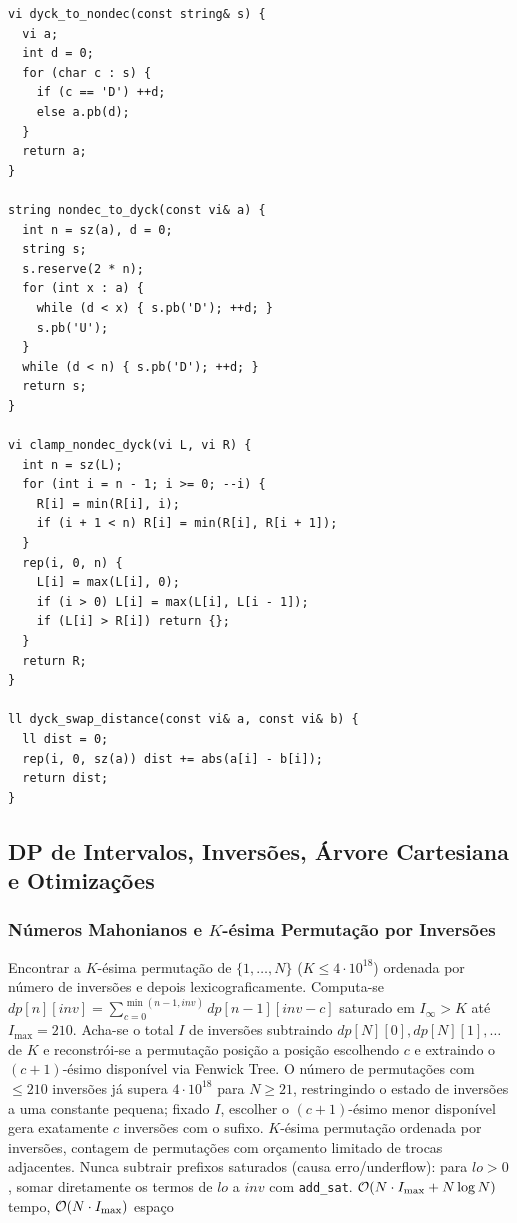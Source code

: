 \begin{lstlisting}
vi dyck_to_nondec(const string& s) {
  vi a;
  int d = 0;
  for (char c : s) {
    if (c == 'D') ++d;
    else a.pb(d);
  }
  return a;
}

string nondec_to_dyck(const vi& a) {
  int n = sz(a), d = 0;
  string s;
  s.reserve(2 * n);
  for (int x : a) {
    while (d < x) { s.pb('D'); ++d; }
    s.pb('U');
  }
  while (d < n) { s.pb('D'); ++d; }
  return s;
}

vi clamp_nondec_dyck(vi L, vi R) {
  int n = sz(L);
  for (int i = n - 1; i >= 0; --i) {
    R[i] = min(R[i], i);
    if (i + 1 < n) R[i] = min(R[i], R[i + 1]);
  }
  rep(i, 0, n) {
    L[i] = max(L[i], 0);
    if (i > 0) L[i] = max(L[i], L[i - 1]);
    if (L[i] > R[i]) return {};
  }
  return R;
}

ll dyck_swap_distance(const vi& a, const vi& b) {
  ll dist = 0;
  rep(i, 0, sz(a)) dist += abs(a[i] - b[i]);
  return dist;
}
\end{lstlisting}

\subsection{DP de Intervalos, Inversões, Árvore Cartesiana e Otimizações}

\subsubsection{Números Mahonianos e $K$-ésima Permutação por Inversões}
\algobox
  {Encontrar a $K$-ésima permutação de $\{1, \dots, N\}$ ($K \le 4 \cdot 10^{18}$) ordenada por número de inversões e depois lexicograficamente.}
  {Computa-se $dp[n][inv] = \sum_{c=0}^{\min(n-1, inv)} dp[n-1][inv - c]$ saturado em $I_\infty > K$ até $I_{\max} = 210$. Acha-se o total $I$ de inversões subtraindo $dp[N][0], dp[N][1], \dots$ de $K$ e reconstrói-se a permutação posição a posição escolhendo $c$ e extraindo o $(c+1)$-ésimo disponível via Fenwick Tree.}
  {O número de permutações com $\le 210$ inversões já supera $4 \cdot 10^{18}$ para $N \ge 21$, restringindo o estado de inversões a uma constante pequena; fixado $I$, escolher o $(c+1)$-ésimo menor disponível gera exatamente $c$ inversões com o sufixo.}
  {$K$-ésima permutação ordenada por inversões, contagem de permutações com orçamento limitado de trocas adjacentes.}
  {Nunca subtrair prefixos saturados (causa erro/underflow): para $lo > 0$, somar diretamente os termos de $lo$ a $inv$ com \texttt{add\_sat}.}
  {$\mathcal{O}(N \cdot I_{\max} + N \log N)$ tempo, $\mathcal{O}(N \cdot I_{\max})$ espaço}

